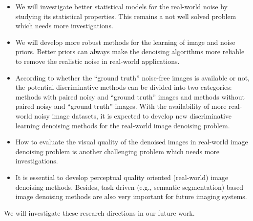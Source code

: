 \begin{itemize}
\item We will investigate better statistical models for the real-world noise by studying its statistical properties. This remains a not well solved problem which needs more investigations.

\item We will develop more robust methods for the learning of image and noise priors. Better priors can always make the denoising algorithms more reliable to remove the realistic noise in real-world applications.

\item According to whether the ``ground truth'' noise-free images is available or not, the potential discriminative methods can be divided into two categories: methods with paired noisy and ``ground truth'' images and methods without paired noisy and ``ground truth'' images. With the availability of more real-world noisy image datasets, it is expected to develop new discriminative learning denoising methods for the real-world image denoising problem. 

\item How to evaluate the visual quality of the denoised images in real-world image denoising problem is another challenging problem which needs more investigations.

\item It is essential to develop perceptual quality oriented (real-world) image denoising methods. Besides, task driven (e.g., semantic segmentation) based image denoising methods are also very important for future imaging systems.

\end{itemize}

We will investigate these research directions in our future work.
